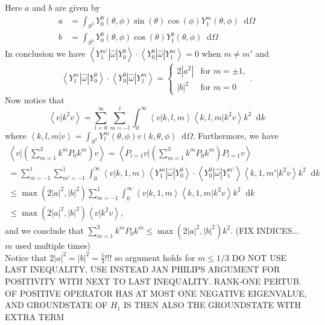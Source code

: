 \documentclass[a4paper,11pt]{article}
\newcommand{\abs}[1]{\left\lvert #1 \right\rvert}
\renewcommand{\braket}[1]{\left\langle#1\right\rangle}
\newcommand*\diff{\mathop{}\!\mathrm{d}}
\numberwithin{equation}{section}
\begin{document}
Here $ a $ and $ b $ are given by\begin{equation}
\begin{aligned}
a&=\int_{S^2}Y^0_0(\theta,\phi)\sin(\theta)\cos(\phi)Y_1^m(\theta,\phi)\diff \Omega\\
b&=\int_{S^2}Y^0_0(\theta,\phi)\cos(\theta)Y_1^0(\theta,\phi)\diff \Omega
\end{aligned}
\end{equation}
In conclusion we have $ \braket{Y_1^{m'}|\hat{\omega}|Y_0^0}\cdot\braket{Y_0^0|\hat{\omega}|Y_1^m}=0 $ when $ m\neq m' $ and\begin{equation}
\braket{Y_1^{m}|\hat{\omega}|Y_0^0}\cdot\braket{Y_0^0|\hat{\omega}|Y_1^m}=\begin{cases}
2\abs{a^2}&\text{for }m=\pm1,\\
\abs{b}^2
&\text{for }m=0\end{cases}.
\end{equation} Now notice that \begin{equation}
\braket{v|k^2v}=\sum_{l=0}^{\infty}\sum_{m=-l}^{l}\int_{0}^{\infty}\braket{v|k,l,m}\braket{k,l,m|k^2v}k^2\diff k
\end{equation}
where $ \braket{k,l,m|v}=\int_{S^2}Y_l^m(\theta,\phi)v(k,\theta,\phi)\diff\Omega $. Furthermore, we have \begin{equation}
\begin{aligned}
\braket{v\Bigg|\left(\sum_{m=1}^{3}k^mP_0k^m\right)v}=\braket{P_{l=1}v\Bigg|\left(\sum_{m=1}^{3}k^mP_0k^m\right)P_{l=1}v}\\
=\sum_{m=-1}^{1}\sum_{m'=-1}^{1}\int_{0}^{\infty}\braket{v|k,1,m}\braket{Y_1^m|\hat{\omega}|Y_0^0}\cdot\braket{Y_0^0|\hat{\omega}|Y_1^{m'}}\braket{k,1,m'|k^2v}k^2\diff k\\
\leq \max(2\abs{a}^2,\abs{b}^2)\sum_{m=-1}^{1}\int_{0}^{\infty}\braket{v|k,1,m}\braket{k,1,m|k^2v}k^2\diff k\\
\leq \max(2\abs{a}^2,\abs{b}^2)\braket{v|k^2v},
\end{aligned}
\end{equation}
and we conclude that $ \sum_{m=1}^{3}k^mP_0k^m\leq \max(2\abs{a}^2,\abs{b}^2) k^2 $. (FIX INDICES... $ m $ used multiple times)\\
Notice that $ 2\abs{a}^2=\abs{b}^2=\frac{1}{3} $!!! so argument holds for $ m\leq 1/3 $
DO NOT USE LAST INEQUALITY, USE INSTEAD JAN PHILIPS ARGUMENT FOR POSITIVITY WITH NEXT TO LAST INEQUALITY. RANK-ONE PERTUB. OF POSITIVE OPERATOR HAS AT MOST ONE NEGATIVE EIGENVALUE, AND GROUNDSTATE OF $ H_1 $ IS THEN ALSO THE GROUNDSTATE WITH EXTRA TERM\\
\end{document}
